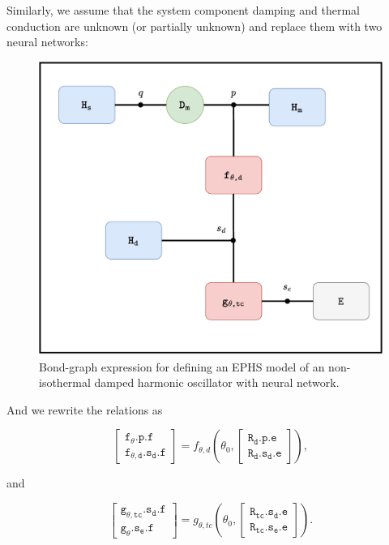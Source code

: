 \documentclass[
	parskip, 			   %
	twoside, 			   %
	DIV=14, 			   %
	BCOR=15.0mm, 		   %
	headsepline, 		   %
	open=right, 		   %
	captions=tableheading, %
	bibliography=totoc,    %
	numbers=noenddot       %
]{scrreprt}
\begin{document}
Similarly, we assume that the system component damping and thermal conduction are unknown (or partially unknown) and replace them with two neural networks:

\begin{figure}[h!]
    \centering
    \includegraphics[scale=0.6]{figures/bondgraph_ndho_exergetic_NN.pdf}
    \caption{Bond-graph expression for defining an EPHS model of an non-isothermal damped harmonic oscillator with neural network.}
    \label{fig:bondgraph_ndho_exergetic_NN}
\end{figure}

And we rewrite the relations as

\begin{equation}
    \label{eq:resistive_structure_damping_interconnection_NN_ndho}
    \left[\begin{array}{l}\mathtt{f_{\theta}.p.f} \\ \mathtt{f_{\theta, d}.s_{d}.f}\end{array}\right]=f_{\theta,d} \left(\theta_0, 
    \left[\begin{array}{l}\mathtt{R_{d}.p.e} \\ \mathtt{R_{d}.s_{d}.e}\end{array}\right] \right),
\end{equation}

and

\begin{equation}
    \label{eq:resistive_structure_thermal_conduction_interconnection_NN_ndho}
    \left[\begin{array}{l}\mathtt{g_{\theta, tc}.s_{d}.f} \\ \mathtt{g_{\theta}.s_{e}.f}\end{array}\right]=g_{\theta,tc} \left(\theta_0, 
    \left[\begin{array}{l} \mathtt{R_{tc}.s_{d}.e} \\ \mathtt{R_{tc}.s_{e}.e}\end{array}\right] \right).
\end{equation}
\end{document}
